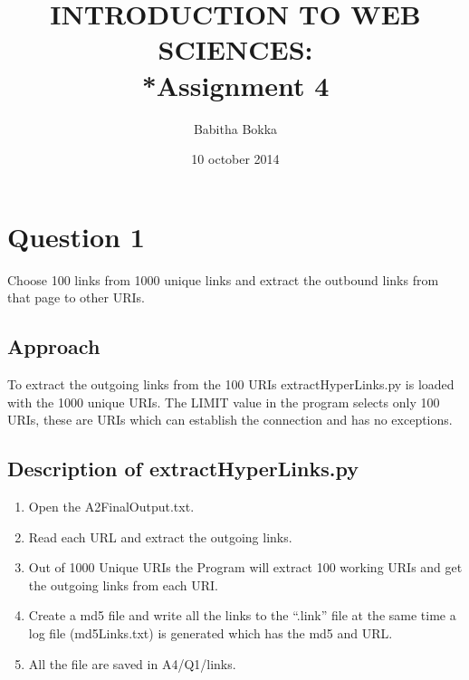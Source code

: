 \documentclass[12pt]{article}
\begin{document}
\begin{titlepage}
\title{INTRODUCTION TO WEB SCIENCES:\\*Assignment 4}
\author{Babitha Bokka}
\date{10 october 2014}
\maketitle
\end{titlepage}

\tableofcontents
\newpage
\section{Question 1}
Choose 100 links from 1000 unique links and extract the outbound links from that page to other URIs.
\subsection{Approach}
To extract the outgoing links from the 100 URIs extractHyperLinks.py is loaded with the 1000 unique URIs. The LIMIT value in the program selects only 100 URIs, these are URIs which can establish the connection and has no exceptions.
\subsection{Description of extractHyperLinks.py}
\begin{enumerate}
	\item Open the A2FinalOutput.txt.
	\item Read each URL and extract the outgoing links.
	\item Out of 1000 Unique URIs the Program will extract 100 working URIs and get the outgoing links from each URI.
	\item Create a md5 file and write all the links to the ``.link'' file at the same time a log file (md5Links.txt) is generated which has the md5 and URL.	
	\item All the file are saved in A4/Q1/links.	
\end{enumerate}
\newpage
\end{document}
